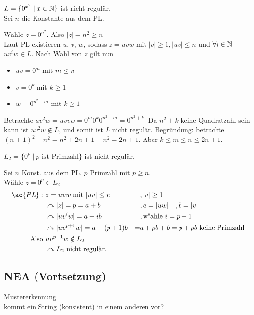 {\begin{Bsp*}
\end{Bsp*}
\begin{Bsp*}
        $L=\{0^{x^2} \mid x\in\mathbb{N}\}$ ist nicht regulär.\\
        Sei $n$ die Konstante aus dem \ac{PL}.
        
        Wähle $z=0^{n^2}$. Also $|z|=n^2\geq n$\\
        Laut PL existieren $u$, $v$, $w$, sodass $z=uvw$ mit $|v|\geq 1, |uv|\leq n$ und $\forall i \in \mathbb{N}$ $uv^iw \in L$. Nach Wahl von $z$ gilt nun
  \begin{itemize}
  \item $uv = 0^m$ mit $m\leq n$
  \item $v = 0^k$ mit $k\geq 1$
  \item $w = 0^{n^2 - m}$ mit $k\geq 1$
  \end{itemize}
  Betrachte $uv^2w = uvvw = 0^{m}0^k0^{n^2-m} = 0^{n^2+k}$.
  Da $n^2+k$ keine Quadratzahl sein kann ist $uv^2w \not \in L$, und somit ist $L$ nicht regulär.
  Begründung: betrachte $(n+1)^2 - n^2 = n^2 + 2n + 1 - n^2 = 2n + 1$.
  Aber $k \le m \le n \le 2n + 1$.
\end{Bsp*}

\begin{Bsp*}
$L_2 = \{0^p \mid p\text{ ist Primzahl}\}$ ist nicht regulär.

Sei $n$ Konst. aus dem \ac{PL}, $p$ Primzahl mit $p \geq n$.\\
Wähle $z=0^p \in L_2$
\begin{align*}
        \ac{PL}:\ &z=uvw \text{ mit } |uv|\leq n &&,|v| \geq 1\\
        &\curvearrowright |z|= p=a+b &&, a = |uw| \quad, b= |v|\\
        &\curvearrowright |uv^iw| = a + ib &&, \text{w"ahle }i=p+1\\
        &\curvearrowright |uv^{p+1}w| = a + (p+1)b & =& a + pb + b = p+pb \text{ keine Primzahl} \\
        \text{Also } &uv^{p+1}w \notin L_2\\
        &\curvearrowright L_2\text{ nicht regulär.}
\end{align*}
\end{Bsp*}

\subsection[\acf{NEA}]{\acf{NEA} (Vortsetzung)}
\begin{Bsp*} Mustererkennung\\
	kommt ein String (konsistent) in einem anderen vor?
	

\end{Bsp*}}
